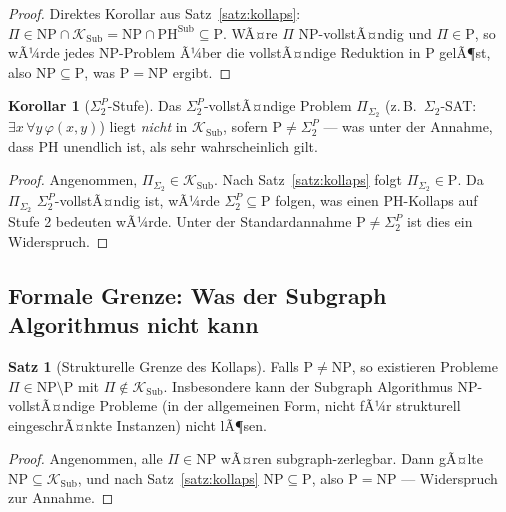 ﻿\documentclass[a4paper,12pt]{article}
\theoremstyle{definition}
\newtheorem{satz}{Satz}
\newtheorem{korollar}{Korollar}
\begin{document}
\begin{proof}
  Direktes Korollar aus Satz~\ref{satz:kollaps}: $\Pi \in \mathrm{NP} \cap \mathcal{K}_\mathrm{Sub}
  = \mathrm{NP} \cap \mathrm{PH}^{\mathrm{Sub}} \subseteq \mathrm{P}$.
  WÃ¤re $\Pi$ NP-vollstÃ¤ndig und $\Pi \in \mathrm{P}$, so wÃ¼rde jedes NP-Problem
  Ã¼ber die vollstÃ¤ndige Reduktion in P gelÃ¶st, also $\mathrm{NP} \subseteq \mathrm{P}$,
  was $\mathrm{P} = \mathrm{NP}$ ergibt.
\end{proof}

\begin{korollar}[$\Sigma_2^P$-Stufe]
\label{kor:sigma2}
  Das $\Sigma_2^P$-vollstÃ¤ndige Problem $\Pi_{\Sigma_2}$ (z.\,B.\ $\Sigma_2$-SAT:
  $\exists x\, \forall y\, \varphi(x,y)$) liegt \emph{nicht} in $\mathcal{K}_\mathrm{Sub}$,
  sofern $\mathrm{P} \neq \Sigma_2^P$ --- was unter der Annahme, dass PH unendlich ist,
  als sehr wahrscheinlich gilt.
\end{korollar}

\begin{proof}
  Angenommen, $\Pi_{\Sigma_2} \in \mathcal{K}_\mathrm{Sub}$.
  Nach Satz~\ref{satz:kollaps} folgt $\Pi_{\Sigma_2} \in \mathrm{P}$.
  Da $\Pi_{\Sigma_2}$ $\Sigma_2^P$-vollstÃ¤ndig ist, wÃ¼rde $\Sigma_2^P \subseteq \mathrm{P}$
  folgen, was einen PH-Kollaps auf Stufe 2 bedeuten wÃ¼rde.
  Unter der Standardannahme $\mathrm{P} \neq \Sigma_2^P$ ist dies ein Widerspruch.
\end{proof}

\subsection{Formale Grenze: Was der Subgraph Algorithmus nicht kann}

\begin{satz}[Strukturelle Grenze des Kollaps]
\label{satz:grenze}
  Falls $\mathrm{P} \neq \mathrm{NP}$, so existieren Probleme
  $\Pi \in \mathrm{NP} \setminus \mathrm{P}$ mit $\Pi \notin \mathcal{K}_\mathrm{Sub}$.
  Insbesondere kann der Subgraph Algorithmus NP-vollstÃ¤ndige Probleme
  (in der allgemeinen Form, nicht fÃ¼r strukturell eingeschrÃ¤nkte Instanzen)
  nicht lÃ¶sen.
\end{satz}

\begin{proof}
  Angenommen, alle $\Pi \in \mathrm{NP}$ wÃ¤ren subgraph-zerlegbar.
  Dann gÃ¤lte $\mathrm{NP} \subseteq \mathcal{K}_\mathrm{Sub}$,
  und nach Satz~\ref{satz:kollaps} $\mathrm{NP} \subseteq \mathrm{P}$,
  also $\mathrm{P} = \mathrm{NP}$ --- Widerspruch zur Annahme.
\end{proof}
\end{document}
